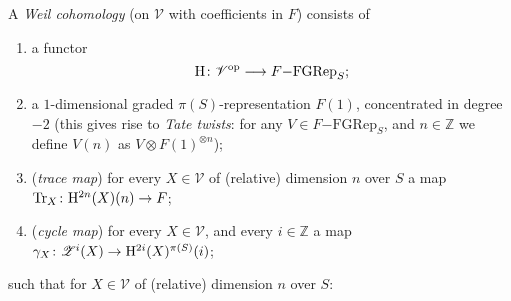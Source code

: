 \documentclass[a4paper,10pt]{article}
\makeatletter
\newcommand*\map@arrow[1][]{\csname#1rightarrow\endcsname{}}
\newcommand*\function@textstyle[4][]{#2\colon#3\map@arrow[#1]#4}
\newcommand*\function[4][]{%
	\mathchoice
	{\function@textstyle[long#1]{#2}{#3}{#4}}
	{\function@textstyle[#1]{#2}{#3}{#4}}
	{\function@textstyle[#1]{#2}{#3}{#4}}
	{\function@textstyle[#1]{#2}{#3}{#4}}
}
\def\basepieces{\mathscr{V}}
\newcommand{\fgrep}[2]{#1\mathrm{-FGRep}_{#2}}
\def\coh{\mathrm{H}}
\def\tensor{\otimes}
\def\cyc{\mathscr{Z}}
\def\Tr{\mathrm{Tr}}
\makeatother
\begin{document}
A \emph{Weil cohomology} (on $\basepieces$ with coefficients in $F$) consists
of
\begin{enumerate}[label=(D\arabic*)] %
	\item a functor
		\[
			\function{\coh}%
			{\basepieces^{\mathrm{op}}}%
			{\fgrep{F}{S}};
		\]
	\item a $1$-dimensional graded $\pi(S)$-representation $F(1)$,
		concentrated in degree $-2$ (this gives rise to \emph{Tate
		twists}: for any $V \in \fgrep{F}{S}$, and $n \in \mathbb{Z}$
		we define $V(n)$ as $V \tensor F(1)^{\tensor n}$);
	\item (\emph{trace map}) for every $X \in \basepieces$ of (relative)
		dimension $n$ over $S$ a map
		$\function{\Tr_{X}}{\coh^{2n}(X)(n)}{F}$;
	\item (\emph{cycle map}) for every $X \in \basepieces$, and every $i
		\in \mathbb{Z}$ a map
		$\function{\gamma_{X}}%
		{\cyc^{i}(X)}{\coh^{2i}(X)^{\pi(S)}(i)}$;
\end{enumerate} %
such that for $X \in \basepieces$ of (relative) dimension $n$ over $S$:
\end{document}
